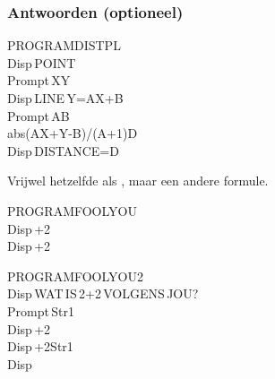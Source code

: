 \begin{frame}
\frametitle{Antwoorden (optioneel)}

\begin{ticalc}[5cm]
	PROGRAM\:DISTPL \\%
	\:Disp\,\qt POINT\:\qt \\%
	\:Prompt\,X\comma Y \\%
	\:Disp\,\qt LINE\,Y=AX+B\:\qt \\%
	\:Prompt\,A\comma B \\%
	\:abs(\min AX+Y-B)/\sqrt(A\sq+1)\>D \\%
	\:Disp\,\qt DISTANCE=\qt\comma D%
\end{ticalc}
\begin{minipage}{5cm}
	Vrijwel hetzelfde als , maar een andere formule.
\end{minipage}

\vspace{0.3cm}

\begin{ticalc}[4.5cm]
	PROGRAM\:FOOLYOU \\%
	\:Disp\,+2\qt{} \\%
	\:Disp\,+2\qt{}
\end{ticalc}
\begin{ticalc}[4.5cm]
	PROGRAM\:FOOLYOU2 \\%
	\:Disp\,\qt WAT\,IS\,2+2\,VOLGENS\,JOU?\qt \\%
	\:Prompt\,Str1 \\%
	\:Disp\,+2\qt{} \\%
	\:Disp\,+2\qt\comma Str1 \\%
	\:Disp\,\qt\qt\comma\qt\qt
\end{ticalc}


\end{frame}

